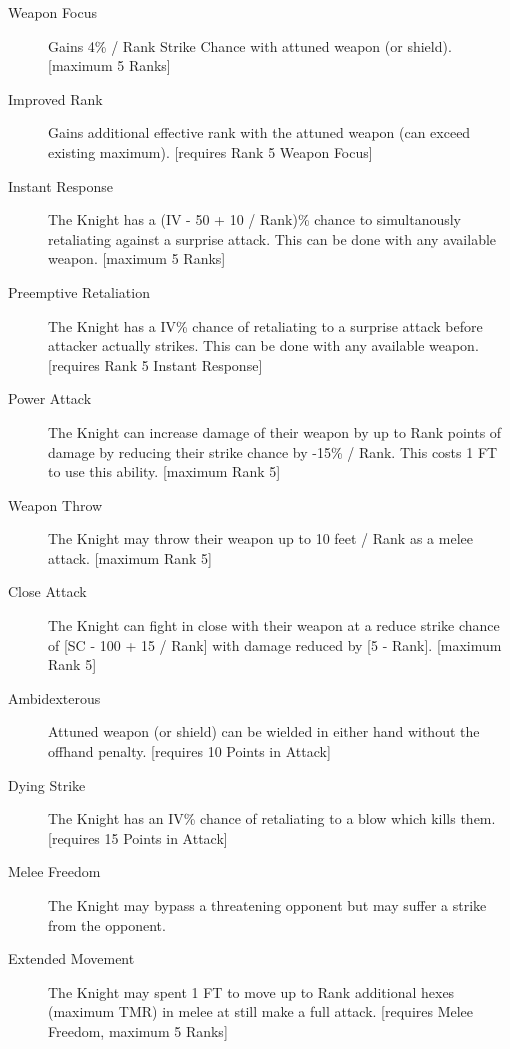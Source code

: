 \documentclass[a4paper]{article}
\begin{document}
\begin{multicols*}{3}
\begin{description}
\item[Weapon Focus] Gains 4\% / Rank Strike Chance with attuned weapon
  (or shield).  [maximum 5 Ranks]

\item[Improved Rank] Gains additional effective rank with the attuned
  weapon (can exceed existing maximum).  [requires Rank 5 Weapon Focus]

\item[Instant Response] The Knight has a (IV - 50 + 10 / Rank)\%
  chance to simultanously retaliating against a surprise attack.  This
  can be done with any available weapon.  [maximum 5 Ranks]

\item[Preemptive Retaliation] The Knight has a IV\% chance of
  retaliating to a surprise attack before attacker actually strikes.
  This can be done with any available weapon.  [requires Rank 5 Instant
    Response]

\item[Power Attack] The Knight can increase damage of their weapon by
  up to Rank points of damage by reducing their strike chance by -15\%
  / Rank. This costs 1 FT to use this ability.  [maximum Rank 5]

\item[Weapon Throw] The Knight may throw their weapon up to 10 feet /
  Rank as a melee attack.  [maximum Rank 5]

\item[Close Attack] The Knight can fight in close with their weapon at
  a reduce strike chance of [SC - 100 + 15 / Rank] with damage reduced
  by [5 - Rank].  [maximum Rank 5]

\item[Ambidexterous] Attuned weapon (or shield) can be wielded in
  either hand without the offhand penalty.  [requires 10 Points in
    Attack]

\item[Dying Strike] The Knight has an IV\% chance of retaliating to a
  blow which kills them.  [requires 15 Points in Attack]

\item[Melee Freedom] The Knight may bypass a threatening opponent but
  may suffer a strike from the opponent.

\item[Extended Movement] The Knight may spent 1 FT to move up to Rank
  additional hexes (maximum TMR) in melee at still make a full attack.
  [requires Melee Freedom, maximum 5 Ranks]


\end{description}
\end{multicols*}
\end{document}
